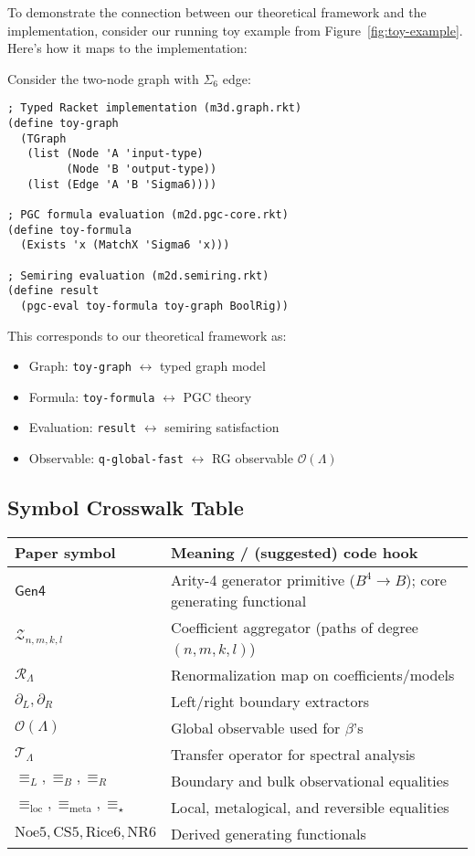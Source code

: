 To demonstrate the connection between our theoretical framework and the implementation, consider our running toy example from Figure~\ref{fig:toy-example}. Here's how it maps to the implementation:

\begin{example}
\label{ex:implementation-mapping}
Consider the two-node graph with $\Sigma_6$ edge:
\begin{verbatim}
; Typed Racket implementation (m3d.graph.rkt)
(define toy-graph
  (TGraph
   (list (Node 'A 'input-type)
         (Node 'B 'output-type))
   (list (Edge 'A 'B 'Sigma6))))

; PGC formula evaluation (m2d.pgc-core.rkt)
(define toy-formula
  (Exists 'x (MatchX 'Sigma6 'x)))

; Semiring evaluation (m2d.semiring.rkt)
(define result
  (pgc-eval toy-formula toy-graph BoolRig))
\end{verbatim}

This corresponds to our theoretical framework as:
\begin{itemize}
\item Graph: \texttt{toy-graph} $\leftrightarrow$ typed graph model
\item Formula: \texttt{toy-formula} $\leftrightarrow$ PGC theory
\item Evaluation: \texttt{result} $\leftrightarrow$ semiring satisfaction
\item Observable: \texttt{q-global-fast} $\leftrightarrow$ RG observable $\mathcal{O}(\Lambda)$
\end{itemize}
\end{example}

\subsection{Symbol Crosswalk Table}

\begin{center}
\begin{tabular}{ll}
\toprule
Paper symbol & Meaning / (suggested) code hook \\
\midrule
$\mathsf{Gen4}$ & Arity-4 generator primitive ($B^4 \to B$); core generating functional \\
$\mathcal{Z}_{n,m,k,l}$ & Coefficient aggregator (paths of degree $(n,m,k,l)$) \\
$\mathcal{R}_\Lambda$ & Renormalization map on coefficients/models \\
$\partial_L, \partial_R$ & Left/right boundary extractors \\
$\mathcal{O}(\Lambda)$ & Global observable used for $\beta$'s \\
$\mathcal{T}_\Lambda$ & Transfer operator for spectral analysis \\
$\equiv_L, \equiv_B, \equiv_R$ & Boundary and bulk observational equalities \\
$\equiv_{\text{loc}}, \equiv_{\text{meta}}, \equiv_\star$ & Local, metalogical, and reversible equalities \\
$\text{Noe5}, \text{CS5}, \text{Rice6}, \text{NR6}$ & Derived generating functionals \\
\bottomrule
\end{tabular}
\end{center}
